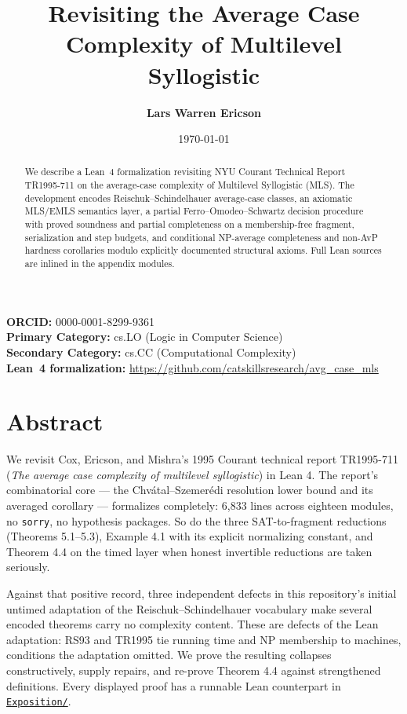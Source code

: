 \documentclass[11pt,a4paper]{article}
\title{\textbf{Revisiting the Average Case Complexity of Multilevel Syllogistic}}
\author[1]{\textbf{Lars Warren Ericson}}
\affil[1]{Catskills Research Company}
\affil[1]{\texttt{lars.ericson@catskillsresearch.com}}
\date{\today}
\begin{document}
        \maketitle

        \begin{center}
          \small
          \textbf{ORCID:} 0000-0001-8299-9361 \\
          \textbf{Primary Category:} cs.LO (Logic in Computer Science) \\
          \textbf{Secondary Category:} cs.CC (Computational Complexity) \\[0.5em]
          \textbf{Lean~4 formalization:} \url{https://github.com/catskillsresearch/avg\_case\_mls}
        \end{center}

        \begin{abstract}
        We describe a Lean~4 formalization revisiting NYU Courant Technical Report TR1995-711
on the average-case complexity of Multilevel Syllogistic (MLS). The development encodes
Reischuk--Schindelhauer average-case classes, an axiomatic MLS/EMLS semantics layer, a
partial Ferro--Omodeo--Schwartz decision procedure with proved soundness and partial
completeness on a membership-free fragment, serialization and step budgets, and
conditional NP-average completeness and non-AvP hardness corollaries modulo explicitly
documented structural axioms. Full Lean sources are inlined in the appendix modules.
        \end{abstract}

\hypertarget{abstract}{%
\section{Abstract}\label{abstract}}

We revisit Cox, Ericson, and Mishra's 1995 Courant technical report TR1995-711 (\emph{The average case complexity of multilevel syllogistic}) in Lean 4. The report's combinatorial core --- the Chvátal--Szemerédi resolution lower bound and its averaged corollary --- formalizes completely: 6,833 lines across eighteen modules, no \texttt{sorry}, no hypothesis packages. So do the three SAT-to-fragment reductions (Theorems 5.1--5.3), Example 4.1 with its explicit normalizing constant, and Theorem 4.4 on the timed layer when honest invertible reductions are taken seriously.

Against that positive record, three independent defects in this repository's initial untimed adaptation of the Reischuk--Schindelhauer vocabulary make several encoded theorems carry no complexity content. These are defects of the Lean adaptation: RS93 and TR1995 tie running time and NP membership to machines, conditions the adaptation omitted. We prove the resulting collapses constructively, supply repairs, and re-prove Theorem 4.4 against strengthened definitions. Every displayed proof has a runnable Lean counterpart in \href{Exposition/}{\texttt{Exposition/}}.
\end{document}
